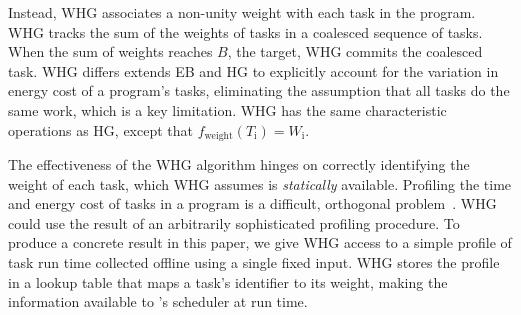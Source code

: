 Instead, WHG associates a non-unity weight with each task in the program. 
%
WHG tracks the sum of the weights of tasks in a coalesced sequence of tasks.
%
When the sum of weights reaches $B$, the target, WHG commits the coalesced
task.
%
WHG differs extends EB and HG to explicitly account for the variation in energy
cost of a program's tasks, eliminating the assumption that all tasks do the
same work, which is a key limitation.
%
WHG has the same characteristic operations as HG, except that
$f_\text{weight}(T_\text{i}) = W_\text{i}$.

The effectiveness of the WHG algorithm hinges on correctly identifying the
weight of each task, which WHG assumes is {\em statically} available.
%
Profiling the time and energy cost of tasks in a program is a difficult,
orthogonal problem~\cite{cleancut,baghsorkhi_cgo_2018}.
%
WHG could use the result of an arbitrarily sophisticated profiling procedure.
%
To produce a concrete result in this paper, we give WHG access to a simple
profile of task run time collected offline using a single fixed input.
%
WHG stores the profile in a lookup table that maps a task's identifier to its
weight, making the information available to \sys's scheduler at run time.
